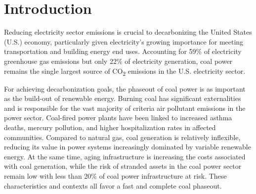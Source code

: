 \setlength{\parindent}{20pt}



\section{Introduction}


Reducing electricity sector emissions is crucial to decarbonizing the United States (U.S.) economy, particularly given electricity's growing importance for meeting transportation and building energy end uses. Accounting for 59\% of electricity greenhouse gas emissions but only 22\% of electricity generation, coal power remains the single largest source of CO\textsubscript{2} emissions in the U.S. electricity sector.

For achieving decarbonization goals, the phaseout of coal power is as important as the build-out of renewable energy.
Burning coal has significant externalities and is responsible for the vast majority of criteria air pollutant emissions in the power sector.
Coal-fired power plants have been linked to increased asthma deaths, mercury pollution, and higher hospitalization rates in affected communities.
Compared to natural gas, coal generation is relatively inflexible, reducing its value in power systems increasingly dominated by variable renewable energy. At the same time, aging infrastructure is increasing the costs associated with coal generation, while
the risk of stranded assets in the coal power sector remain low with less than 20\% of coal power infrastructure at risk.
These characteristics and contexts all favor a fast and complete coal phaseout. 


